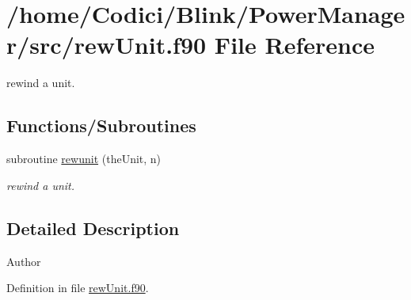 \hypertarget{rew_unit_8f90}{\section{/home/\-Codici/\-Blink/\-Power\-Manager/src/rew\-Unit.f90 File Reference}
\label{rew_unit_8f90}
}


rewind a unit.  


\subsection*{Functions/\-Subroutines}
\begin{DoxyCompactItemize}
\item 
subroutine \hyperlink{rew_unit_8f90_ad71be38edfc5b3981be9de4cd607daa6}{rewunit} (the\-Unit, n)
\begin{DoxyCompactList}\small\item\em rewind a unit. \end{DoxyCompactList}\end{DoxyCompactItemize}


\subsection{Detailed Description}
\begin{DoxyAuthor}{Author}

\end{DoxyAuthor}


Definition in file \hyperlink{rew_unit_8f90_source}{rew\-Unit.\-f90}.



